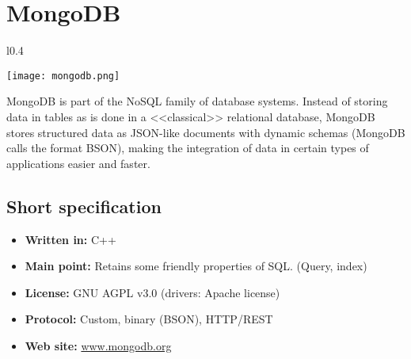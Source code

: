 \chapter{MongoDB}

\begin{wrapfigure}{l}{0.4\textwidth}
  \vspace{-75pt}
  \begin{center}
    \texttt{[image: mongodb.png]}
  \end{center}
  \vspace{-30pt}
\end{wrapfigure}
MongoDB is part of the NoSQL family of database systems. Instead of storing data in tables as is done in a <<classical>> relational database, MongoDB stores structured data as JSON-like documents with dynamic schemas (MongoDB calls the format BSON), making the integration of data in certain types of applications easier and faster.

\section{Short specification}

\begin{itemize}
  \item \textbf{Written in:} C++
  \item \textbf{Main point:} Retains some friendly properties of SQL. (Query, index)
  \item \textbf{License:} GNU AGPL v3.0 (drivers: Apache license)
  \item \textbf{Protocol:} Custom, binary (BSON), HTTP/REST
  \item \textbf{Web site:} \href{http://www.mongodb.org/}{www.mongodb.org}
\end{itemize}